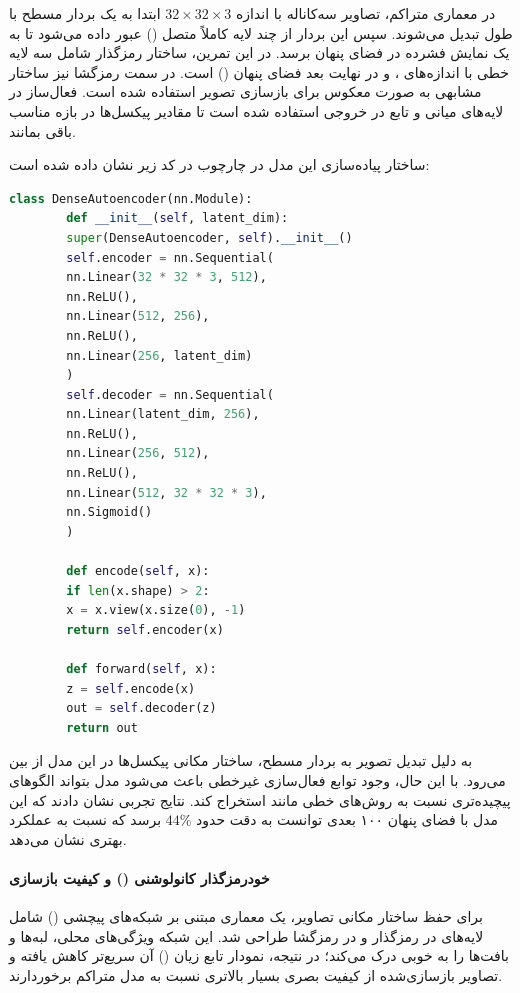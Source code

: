 \documentclass{article}
\begin{document}
در معماری متراکم، تصاویر سه‌کاناله با اندازه $32\times32\times3$ ابتدا به یک بردار مسطح با طول  تبدیل می‌شوند. سپس این بردار از چند لایه کاملاً متصل () عبور داده می‌شود تا به یک نمایش فشرده در فضای پنهان برسد. در این تمرین، ساختار رمزگذار شامل سه لایه خطی با اندازه‌های ،  و در نهایت بعد فضای پنهان () است. در سمت رمزگشا نیز ساختار مشابهی به صورت معکوس برای بازسازی تصویر استفاده شده است. فعال‌ساز  در لایه‌های میانی و تابع  در خروجی استفاده شده است تا مقادیر پیکسل‌ها در بازه مناسب باقی بمانند.

ساختار پیاده‌سازی این مدل در چارچوب  در کد زیر نشان داده شده است:

\begin{latin}
	\begin{lstlisting}[language=Python]
		class DenseAutoencoder(nn.Module):
		def __init__(self, latent_dim):
		super(DenseAutoencoder, self).__init__()
		self.encoder = nn.Sequential(
		nn.Linear(32 * 32 * 3, 512),
		nn.ReLU(),
		nn.Linear(512, 256),
		nn.ReLU(),
		nn.Linear(256, latent_dim)
		)
		self.decoder = nn.Sequential(
		nn.Linear(latent_dim, 256),
		nn.ReLU(),
		nn.Linear(256, 512),
		nn.ReLU(),
		nn.Linear(512, 32 * 32 * 3),
		nn.Sigmoid()
		)
		
		def encode(self, x):
		if len(x.shape) > 2:
		x = x.view(x.size(0), -1)
		return self.encoder(x)
		
		def forward(self, x):
		z = self.encode(x)
		out = self.decoder(z)
		return out
	\end{lstlisting}
\end{latin}

به دلیل تبدیل تصویر به بردار مسطح، ساختار مکانی پیکسل‌ها در این مدل از بین می‌رود. با این حال، وجود توابع فعال‌سازی غیرخطی باعث می‌شود مدل بتواند الگوهای پیچیده‌تری نسبت به روش‌های خطی مانند  استخراج کند. نتایج تجربی نشان دادند که این مدل با فضای پنهان ۱۰۰ بعدی توانست به دقت حدود $44\%$ برسد که نسبت به  عملکرد بهتری نشان می‌دهد.


\paragraph{خودرمزگذار کانولوشنی () و کیفیت بازسازی}
برای حفظ ساختار مکانی تصاویر، یک معماری مبتنی بر شبکه‌های پیچشی () شامل لایه‌های  در رمزگذار و  در رمزگشا طراحی شد. این شبکه ویژگی‌های محلی، لبه‌ها و بافت‌ها را به خوبی درک می‌کند؛ در نتیجه، نمودار تابع زیان () آن سریع‌تر کاهش یافته و تصاویر بازسازی‌شده از کیفیت بصری بسیار بالاتری نسبت به مدل متراکم برخوردارند.
\end{document}
